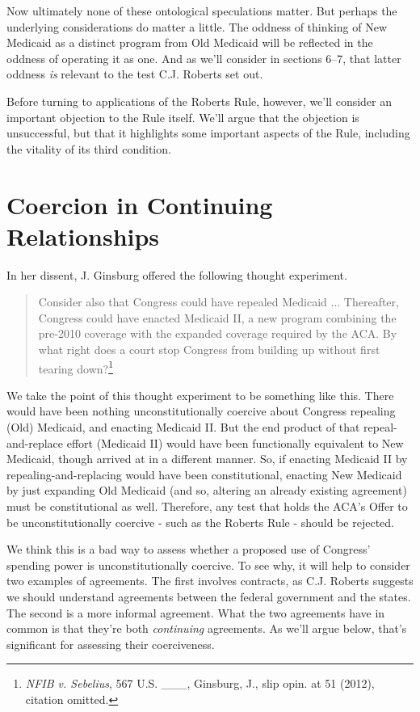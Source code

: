 \documentclass[
  11pt,
  letterpaper,
  DIV=11,
  numbers=noendperiod,
  twoside]{scrartcl}
\newcounter{none} %
\begin{document}
Now ultimately none of these ontological speculations matter. But
perhaps the underlying considerations do matter a little. The oddness of
thinking of New Medicaid as a distinct program from Old Medicaid will be
reflected in the oddness of operating it as one. And as we'll consider
in sections 6--7, that latter oddness \emph{is} relevant to the test
C.J. Roberts set out.

Before turning to applications of the Roberts Rule, however, we'll
consider an important objection to the Rule itself. We'll argue that the
objection is unsuccessful, but that it highlights some important aspects
of the Rule, including the vitality of its third condition.

\section{Coercion in Continuing
Relationships}\label{coercion-in-continuing-relationships}

In her dissent, J. Ginsburg offered the following thought experiment.

\begin{quote}
Consider also that Congress could have repealed Medicaid ... Thereafter,
Congress could have enacted Medicaid II, a new program combining the
pre-2010 coverage with the expanded coverage required by the ACA. By
what right does a court stop Congress from building up without first
tearing down?\footnote{\emph{NFIB v. Sebelius}, 567 U.S. \_\_\_,
  Ginsburg, J., slip opin. at 51 (2012), citation omitted.}
\end{quote}

We take the point of this thought experiment to be something like this.
There would have been nothing unconstitutionally coercive about Congress
repealing (Old) Medicaid, and enacting Medicaid II. But the end product
of that repeal-and-replace effort (Medicaid II) would have been
functionally equivalent to New Medicaid, though arrived at in a
different manner. So, if enacting Medicaid II by repealing-and-replacing
would have been constitutional, enacting New Medicaid by just expanding
Old Medicaid (and so, altering an already existing agreement) must be
constitutional as well. Therefore, any test that holds the ACA's Offer
to be unconstitutionally coercive - such as the Roberts Rule - should be
rejected.

We think this is a bad way to assess whether a proposed use of Congress'
spending power is unconstitutionally coercive. To see why, it will help
to consider two examples of agreements. The first involves contracts, as
C.J. Roberts suggests we should understand agreements between the
federal government and the states. The second is a more informal
agreement. What the two agreements have in common is that they're both
\emph{continuing} agreements. As we'll argue below, that's significant
for assessing their coerciveness.
\end{document}
